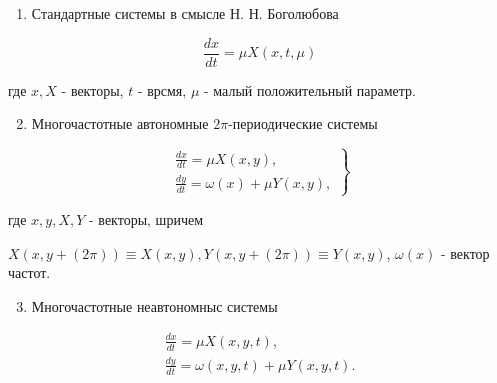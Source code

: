 \documentclass[10pt]{article}
\begin{document}
\begin{enumerate}

  \item Стандартные системы в смысле Н. Н. Боголюбова

\end{enumerate}



\[

\frac{d x}{d t}=\mu X(x, t, \mu)

\]



где $x, X$ - векторы, $t$ - врсмя, $\mu$ - малый положительный параметр.



\begin{enumerate}

  \setcounter{enumi}{1}

  \item Многочастотные автономные $2 \pi$-периодические системы

\end{enumerate}



\[

\left.\begin{array}{l}

\frac{d x}{d t}=\mu X(x, y), \\

\frac{d y}{d t}=\omega(x)+\mu Y(x, y),

\end{array}\right\}

\]



где $x, y, X, Y$ - векторы, шричем



$X(x, y+(2 \pi)) \equiv X(x, y), Y(x, y+(2 \pi)) \equiv Y(x, y)$, $\omega(x)$ - вектор частот.



\begin{enumerate}

  \setcounter{enumi}{2}

  \item Многочастотные неавтономныс системы

\end{enumerate}



\[

\begin{gathered}

\frac{d x}{d t}=\mu X(x, y, t), \\

\frac{d y}{d t}=\omega(x, y, t)+\mu Y(x, y, t) .

\end{gathered}

\]
\end{document}
